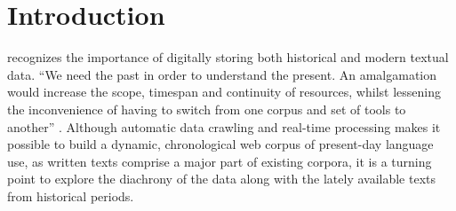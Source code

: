 

\chapter{Introduction}
\textcite{renouf2002time} recognizes the importance of digitally storing both historical and modern textual data. ``We need the past in order to understand the present. An amalgamation would increase the scope, timespan and continuity of resources, whilst lessening the inconvenience of having to switch from one corpus and set of tools to another'' \parencite{renouf2002time}. Although automatic data crawling and real-time processing makes it possible to build a dynamic, chronological web corpus of present-day language use, as written texts comprise a major part of existing corpora, it is a turning point to explore the diachrony of the data along with the lately available texts from historical periods.

